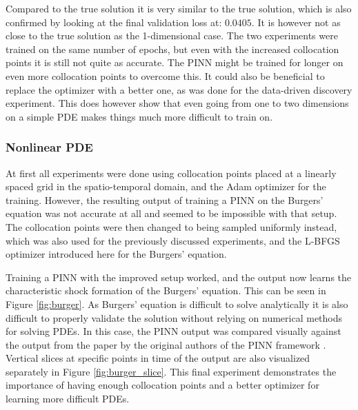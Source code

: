Compared to the true solution it is very similar to the true solution, which is also confirmed by looking at the final validation loss at: $
0.0405$. It is however not as close to the true solution as the 1-dimensional case. The two experiments were trained on the same number of epochs, but even with the increased collocation points it is still not quite as accurate. The PINN might be trained for longer on even more collocation points to overcome this. It could also be beneficial to replace the optimizer with a better one, as was done for the data-driven discovery experiment. This does however show that even going from one to two dimensions on a simple PDE makes things much more difficult to train on.

\subsubsection{Nonlinear PDE}

At first all experiments were done using collocation points placed at a linearly spaced grid in the spatio-temporal domain, and the Adam optimizer for the training. However, the resulting output of training a PINN on the Burgers' equation was not accurate at all and seemed to be impossible with that setup. The collocation points were then changed to being sampled uniformly instead, which was also used for the previously discussed experiments, and the L-BFGS optimizer introduced here for the Burgers' equation.

Training a PINN with the improved setup worked, and the output now learns the characteristic shock formation of the Burgers' equation. This can be seen in Figure \ref{fig:burger}. As Burgers' equation is difficult to solve analytically it is also difficult to properly validate the solution without relying on numerical methods for solving PDEs. In this case, the PINN output was compared visually against the output from the paper by the original authors of the PINN framework \cite{pinn1}. Vertical slices at specific points in time of the output are also visualized separately in Figure \ref{fig:burger_slice}. This final experiment demonstrates the importance of having enough collocation points and a better optimizer for learning more difficult PDEs.

